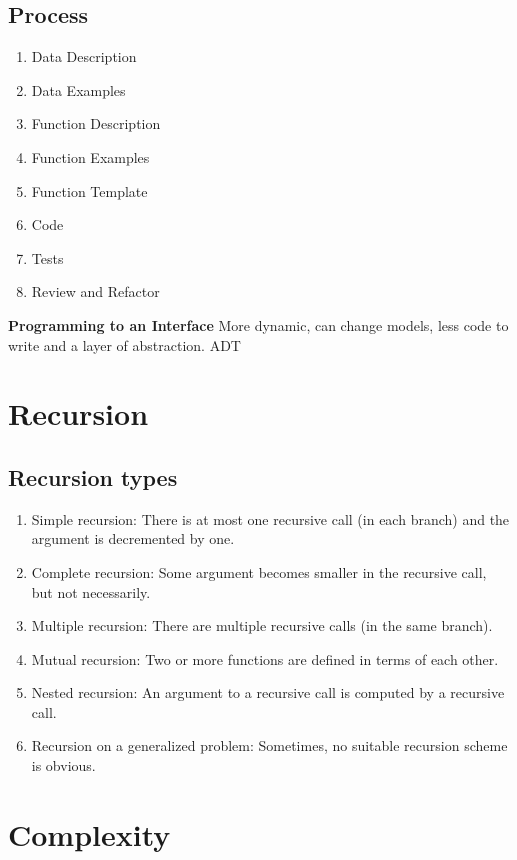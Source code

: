 \subsection{Process}
\begin{enumerate}
\item  Data Description
\item  Data Examples
\item  Function Description
\item  Function Examples
\item  Function Template
\item  Code
\item  Tests
\item  Review and Refactor
\end{enumerate}

\noindent\textbf{Programming to an Interface}
More dynamic, can change models, less code to write and a layer of abstraction. ADT 

\newpage

\section{Recursion}
\subsection{Recursion types}
\begin{enumerate}
\item Simple recursion: There is at most one recursive call (in each branch)
  and the argument is decremented by one.
\item Complete recursion: Some argument becomes smaller in the recursive call, but not necessarily.
\item Multiple recursion: There are multiple recursive calls (in the same branch).
\item Mutual recursion: Two or more functions are defined in terms of each other.
\item Nested recursion: An argument to a recursive call is computed by a recursive call.
\item Recursion on a generalized problem: Sometimes, no suitable recursion scheme is obvious.
\end{enumerate}



\section{Complexity}
